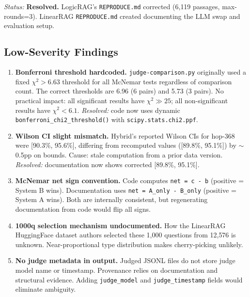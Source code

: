 \textit{Status:} \textbf{Resolved.} LogicRAG's \texttt{REPRODUCE.md} corrected (6{,}119 passages, max-rounds=3). LinearRAG \texttt{REPRODUCE.md} created documenting the LLM swap and evaluation setup.

\subsection{Low-Severity Findings}
\label{sec:low-findings}

\begin{enumerate}

\item \textbf{Bonferroni threshold hardcoded.} \texttt{judge-comparison.py} originally used a fixed $\chi^2 > 6.63$ threshold for all McNemar tests regardless of comparison count. The correct thresholds are 6.96 (6 pairs) and 5.73 (3 pairs). No practical impact: all significant results have $\chi^2 \gg 25$; all non-significant results have $\chi^2 < 6.1$. \textit{Resolved:} code now uses dynamic \texttt{bonferroni\_chi2\_threshold()} with \texttt{scipy.stats.chi2.ppf}.

\item \textbf{Wilson CI slight mismatch.} Hybrid's reported Wilson CIs for hop-368 were [90.3\%, 95.6\%], differing from recomputed values ([89.8\%, 95.1\%]) by $\sim$0.5pp on bounds. Cause: stale computation from a prior data version. \textit{Resolved:} documentation now shows corrected [89.8\%, 95.1\%].

\item \textbf{McNemar net sign convention.} Code computes \texttt{net = c - b} (positive = System B wins). Documentation uses \texttt{net = A\_only - B\_only} (positive = System A wins). Both are internally consistent, but regenerating documentation from code would flip all signs.

\item \textbf{1000q selection mechanism undocumented.} How the LinearRAG HuggingFace dataset authors selected these 1{,}000 questions from 12{,}576 is unknown. Near-proportional type distribution makes cherry-picking unlikely.

\item \textbf{No judge metadata in output.} Judged JSONL files do not store judge model name or timestamp. Provenance relies on documentation and structural evidence. Adding \texttt{judge\_model} and \texttt{judge\_timestamp} fields would eliminate ambiguity.

\end{enumerate}

